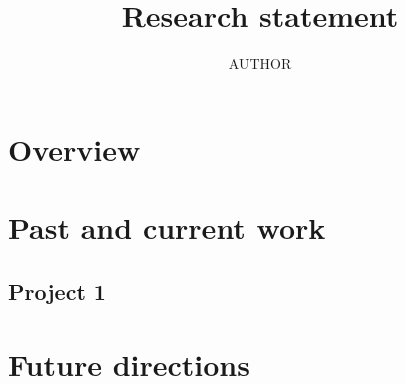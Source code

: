 \documentclass[11pt]{article}
\title{Research statement}
\author{{{AUTHOR}}}
\date{}
\theoremstyle{plain}
\theoremstyle{definition}
\theoremstyle{remark}
\begin{document}
\maketitle
\section*{Overview}
\section*{Past and current work}
\subsection*{Project 1}
\section*{Future directions}


\end{document}

